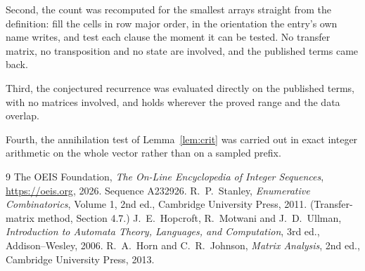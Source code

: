 \documentclass[11pt,a4paper]{article}
\theoremstyle{plain}
\theoremstyle{definition}
\begin{document}
Second, the count was recomputed for the smallest arrays straight from the definition: fill the
cells in row major order, in the orientation the entry's own name writes, and test each clause
the moment it can be tested. No transfer matrix, no transposition and no state are involved,
and the published terms came back.

Third, the conjectured recurrence was evaluated directly on the published terms, with no
matrices involved, and holds wherever the proved range and the data overlap.

Fourth, the annihilation test of Lemma~\ref{lem:crit} was carried out in exact integer
arithmetic on the whole vector rather than on a sampled prefix.

\begin{thebibliography}{9}
 The OEIS Foundation, \emph{The On-Line Encyclopedia of Integer
Sequences}, \url{https://oeis.org}, 2026. Sequence A232926.
 R.~P.~Stanley, \emph{Enumerative Combinatorics}, Volume 1, 2nd ed.,
Cambridge University Press, 2011. (Transfer-matrix method, Section 4.7.)
 J.~E.~Hopcroft, R.~Motwani and J.~D.~Ullman, \emph{Introduction to Automata
Theory, Languages, and Computation}, 3rd ed., Addison--Wesley, 2006.
 R.~A.~Horn and C.~R.~Johnson, \emph{Matrix Analysis}, 2nd ed., Cambridge
University Press, 2013.
\end{thebibliography}
\end{document}
